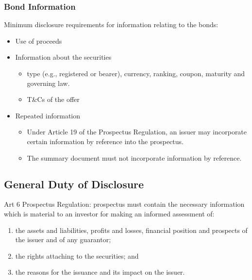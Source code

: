 \documentclass[
]{article}
\providecommand{\tightlist}{%
  \setlength{\itemsep}{0pt}\setlength{\parskip}{0pt}}
\begin{document}
\hypertarget{bond-information}{%
\subsubsection{Bond Information}\label{bond-information}}

Minimum disclosure requirements for information relating to the bonds:

\begin{itemize}
\tightlist
\item
  Use of proceeds
\item
  Information about the securities

  \begin{itemize}
  \tightlist
  \item
    type (e.g., registered or bearer), currency, ranking, coupon,
    maturity and governing law.
  \item
    T\&Cs of the offer
  \end{itemize}
\item
  Repeated information

  \begin{itemize}
  \tightlist
  \item
    Under Article 19 of the Prospectus Regulation, an issuer may
    incorporate certain information by reference into the prospectus.
  \item
    The summary document must not incorporate information by reference.
  \end{itemize}
\end{itemize}

\hypertarget{general-duty-of-disclosure}{%
\subsection{General Duty of
Disclosure}\label{general-duty-of-disclosure}}

Art 6 Prospectus Regulation: prospectus must contain the necessary
information which is material to an investor for making an informed
assessment of:

\begin{enumerate}
\def\labelenumi{\arabic{enumi}.}
\tightlist
\item
  the assets and liabilities, profits and losses, financial position and
  prospects of the issuer and of any guarantor;
\item
  the rights attaching to the securities; and
\item
  the reasons for the issuance and its impact on the issuer.
\end{enumerate}
\end{document}
